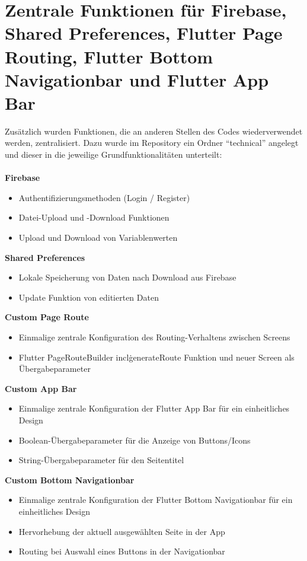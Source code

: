 \section*{Zentrale Funktionen für Firebase, Shared Preferences, Flutter Page Routing, Flutter Bottom Navigationbar und Flutter App Bar}
Zusätzlich wurden Funktionen, die an anderen Stellen des Codes wiederverwendet werden, zentralisiert.
Dazu wurde im Repository ein Ordner ``technical'' angelegt und dieser in die jeweilige Grundfunktionalitäten unterteilt:
\\
\\
\textbf{Firebase}
\begin{itemize}[itemsep=0pt]
    \item{Authentifizierungsmethoden (Login / Register)} 
	\item{Datei-Upload und -Download Funktionen} 
	\item{Upload und Download von Variablenwerten} 
\end{itemize}
\textbf{Shared Preferences}
\begin{itemize}[itemsep=0pt]
    \item{Lokale Speicherung von Daten nach Download aus Firebase} 
	\item{Update Funktion von editierten Daten} 
\end{itemize}
\textbf{Custom Page Route}
\begin{itemize}[itemsep=0pt]
    \item{Einmalige zentrale Konfiguration des Routing-Verhaltens zwischen Screens} 
	\item{Flutter PageRouteBuilder incl\. generateRoute Funktion und neuer Screen als Übergabeparameter} 
\end{itemize}
\textbf{Custom App Bar}
\begin{itemize}[itemsep=0pt]
    \item{Einmalige zentrale Konfiguration der Flutter App Bar für ein einheitliches Design} 
	\item{Boolean-Übergabeparameter für die Anzeige von Buttons/Icons}
	\item{String-Übergabeparameter für den Seitentitel} 
\end{itemize}
\textbf{Custom Bottom Navigationbar}
\begin{itemize}[itemsep=0pt]
    \item{Einmalige zentrale Konfiguration der Flutter Bottom Navigationbar für ein einheitliches Design} 
	\item{Hervorhebung der aktuell ausgewählten Seite in der App}
	\item{Routing bei Auswahl eines Buttons in der Navigationbar} 
\end{itemize}

